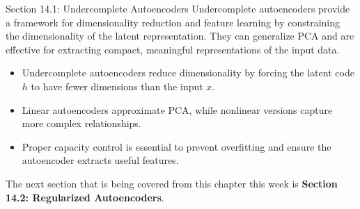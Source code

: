 \begin{notes}{Section 14.1: Undercomplete Autoencoders}
    Undercomplete autoencoders provide a framework for dimensionality reduction and feature learning by constraining the dimensionality of the latent representation. They can generalize PCA and are 
    effective for extracting compact, meaningful representations of the input data.
    
    \begin{highlight}
        \begin{itemize}
            \item Undercomplete autoencoders reduce dimensionality by forcing the latent code $h$ to have fewer dimensions than the input $x$.
            \item Linear autoencoders approximate PCA, while nonlinear versions capture more complex relationships.
            \item Proper capacity control is essential to prevent overfitting and ensure the autoencoder extracts useful features.
        \end{itemize}
    \end{highlight}
\end{notes}

The next section that is being covered from this chapter this week is \textbf{Section 14.2: Regularized Autoencoders}.

